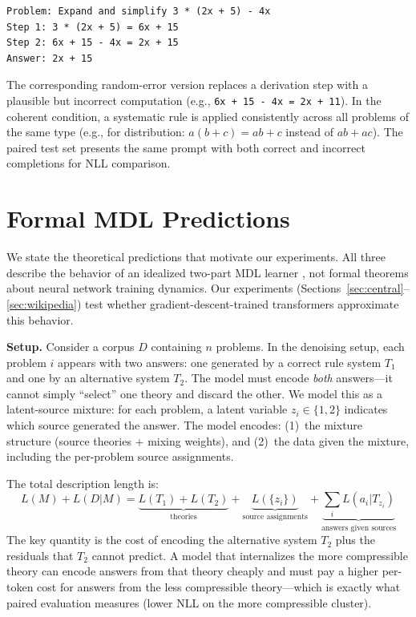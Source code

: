 \documentclass{article}
\begin{document}
\begin{verbatim}
Problem: Expand and simplify 3 * (2x + 5) - 4x
Step 1: 3 * (2x + 5) = 6x + 15
Step 2: 6x + 15 - 4x = 2x + 15
Answer: 2x + 15
\end{verbatim}

The corresponding random-error version replaces a derivation step with a plausible but incorrect computation (e.g., \texttt{6x + 15 - 4x = 2x + 11}). In the coherent condition, a systematic rule is applied consistently across all problems of the same type (e.g., for distribution: $a(b+c) = ab + c$ instead of $ab + ac$). The paired test set presents the same prompt with both correct and incorrect completions for NLL comparison.

\section{Formal MDL Predictions}
\label{app:mdl}

We state the theoretical predictions that motivate our experiments. All three describe the behavior of an idealized two-part MDL learner \citep{rissanen1978modeling,grunwald2007minimum}, not formal theorems about neural network training dynamics. Our experiments (Sections~\ref{sec:central}--\ref{sec:wikipedia}) test whether gradient-descent-trained transformers approximate this behavior.

\textbf{Setup.} Consider a corpus $D$ containing $n$ problems. In the denoising setup, each problem $i$ appears with two answers: one generated by a correct rule system $T_1$ and one by an alternative system $T_2$. The model must encode \emph{both} answers---it cannot simply ``select'' one theory and discard the other. We model this as a latent-source mixture: for each problem, a latent variable $z_i \in \{1,2\}$ indicates which source generated the answer. The model encodes: (1)~the mixture structure (source theories + mixing weights), and (2)~the data given the mixture, including the per-problem source assignments.

The total description length is:
\[
L(M) + L(D|M) = \underbrace{L(T_1) + L(T_2)}_{\text{theories}} + \underbrace{L(\{z_i\})}_{\text{source assignments}} + \underbrace{\sum_i L(a_i | T_{z_i})}_{\text{answers given sources}}
\]
The key quantity is the cost of encoding the alternative system $T_2$ plus the residuals that $T_2$ cannot predict. A model that internalizes the more compressible theory can encode answers from that theory cheaply and must pay a higher per-token cost for answers from the less compressible theory---which is exactly what paired evaluation measures (lower NLL on the more compressible cluster).
\end{document}
